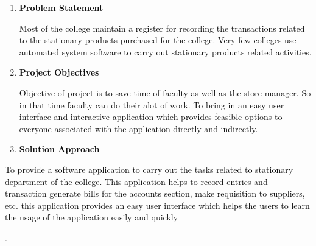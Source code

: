 \documentclass[12pt]{report}
\renewcommand{\_}{\kern-1.5pt\textunderscore\kern-1.5pt}
\begin{document}
\begin{enumerate}
\vspace{\baselineskip}
	\item {\fontsize{14pt}{16.8pt}\selectfont \textbf{\textcolor[HTML]{0D0D0D}{Problem Statement}}\par}\par


\vspace{\baselineskip}
\textcolor[HTML]{0D0D0D}{Most of the college maintain a register for recording the transactions related to the stationary products purchased for the college. Very few colleges use automated system software to carry out stationary products related activities.}\par


\vspace{\baselineskip}
	\item {\fontsize{14pt}{16.8pt}\selectfont \textbf{\textcolor[HTML]{0D0D0D}{Project Objectives}}\par}\par


\vspace{\baselineskip}
\textcolor[HTML]{0D0D0D}{Objective of project is to save time of faculty as well as the store manager. So in that time faculty can do their alot of work. To bring in an easy user interface and interactive application which provides feasible options to everyone associated with the application directly and indirectly.}\par


\vspace{\baselineskip}
	\item {\fontsize{14pt}{16.8pt}\selectfont \textbf{\textcolor[HTML]{0D0D0D}{Solution Approach}}\par}
\end{enumerate}\par


\vspace{\baselineskip}
\begin{adjustwidth}{0.2in}{0.84in}
\textcolor[HTML]{0D0D0D}{To provide a software application to carry out the tasks related to stationary department of the college. This application helps to record entries and transaction generate bills for the accounts section, make requisition to suppliers, etc. this application provides an easy user interface which helps the users to learn the usage of the application easily and quickly}{\fontsize{10pt}{12.0pt}\selectfont \textcolor[HTML]{0D0D0D}{.


\newpage
}\par}\par

\end{adjustwidth}
\end{document}
